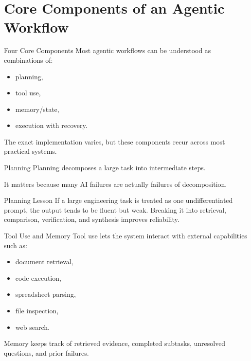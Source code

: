 \documentclass[12pt]{beamer}
\begin{document}
\section{Core Components of an Agentic Workflow}

\begin{frame}{Four Core Components}
  Most agentic workflows can be understood as combinations of:
  \begin{itemize}
    \item planning,
    \item tool use,
    \item memory/state,
    \item execution with recovery.
  \end{itemize}

  The exact implementation varies, but these components recur across most practical systems.
\end{frame}

\begin{frame}{Planning}
  Planning decomposes a large task into intermediate steps.

  It matters because many AI failures are actually failures of decomposition.

  \begin{conceptbox}{Planning Lesson}
    If a large engineering task is treated as one undifferentiated prompt, the output tends to be fluent but weak. Breaking it into retrieval, comparison, verification, and synthesis improves reliability.
  \end{conceptbox}
\end{frame}

\begin{frame}{Tool Use and Memory}
  Tool use lets the system interact with external capabilities such as:
  \begin{itemize}
    \item document retrieval,
    \item code execution,
    \item spreadsheet parsing,
    \item file inspection,
    \item web search.
  \end{itemize}

  Memory keeps track of retrieved evidence, completed subtasks, unresolved questions, and prior failures.
\end{frame}
\end{document}
